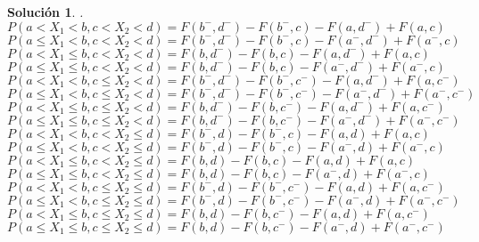 \documentclass[11pt, a4paper]{article}
\newif\IfInSansMode
\theoremstyle{theorem-style}
\theoremstyle{definition-style}
\theoremstyle{remark-style}
\newtheorem*{sol}{Solución}
\theoremstyle{example-style}
\begin{document}
\begin{sol}.
\\ $P(a < X_1 < b, c < X_2 < d) = F(b^{-},d^{-})-F(b^{-},c)-F(a,d^{-})+F(a,c)$ \\
$P(a \le X_1 < b, c < X_2 < d) = F(b^{-},d^{-})-F(b^{-},c)-F(a^{-},d^{-})+F(a^{-},c)$ \\
$P(a < X_1 \le b, c < X_2 < d) = F(b,d^{-})-F(b,c)-F(a,d^{-})+F(a,c)$ \\
$P(a \le X_1 \le b, c < X_2 < d) = F(b,d^{-})-F(b,c)-F(a^{-},d^{-})+F(a^{-},c)$ \\
$P(a < X_1 < b, c \le X_2 < d) = F(b^{-},d^{-})-F(b^{-},c^{-})-F(a,d^{-})+F(a,c^{-})$ \\
$P(a \le X_1 < b, c \le X_2 < d) = F(b^{-},d^{-})-F(b^{-},c^{-})-F(a^{-},d^{-})+F(a^{-},c^{-})$ \\
$P(a < X_1 \le b, c \le X_2 < d) = F(b,d^{-})-F(b,c^{-})-F(a,d^{-})+F(a,c^{-})$ \\
$P(a \le X_1 \le b, c \le X_2 < d) = F(b,d^{-})-F(b,c^{-})-F(a^{-},d^{-})+F(a^{-},c^{-})$ \\
$P(a < X_1 < b, c < X_2 \le d) = F(b^{-},d)-F(b^{-},c)-F(a,d)+F(a,c)$ \\
$P(a \le X_1 < b, c < X_2 \le d) = F(b^{-},d)-F(b^{-},c)-F(a^{-},d)+F(a^{-},c)$ \\
$P(a < X_1 \le b, c < X_2 \le d) = F(b,d)-F(b,c)-F(a,d)+F(a,c)$ \\
$P(a \le X_1 \le b, c < X_2 \le d) = F(b,d)-F(b,c)-F(a^{-},d)+F(a^{-},c)$ \\
$P(a < X_1 < b, c \le X_2 \le d) = F(b^{-},d)-F(b^{-},c^{-})-F(a,d)+F(a,c^{-})$ \\
$P(a \le X_1 < b, c \le X_2 \le d) = F(b^{-},d)-F(b^{-},c^{-})-F(a^{-},d)+F(a^{-},c^{-})$ \\
$P(a < X_1 \le b, c \le X_2 \le d) = F(b,d)-F(b,c^{-})-F(a,d)+F(a,c^{-})$ \\
$P(a \le X_1 \le b, c \le X_2 \le d) = F(b,d)-F(b,c^{-})-F(a^{-},d)+F(a^{-},c^{-})$ \\

\end{sol}

















\end{document}
